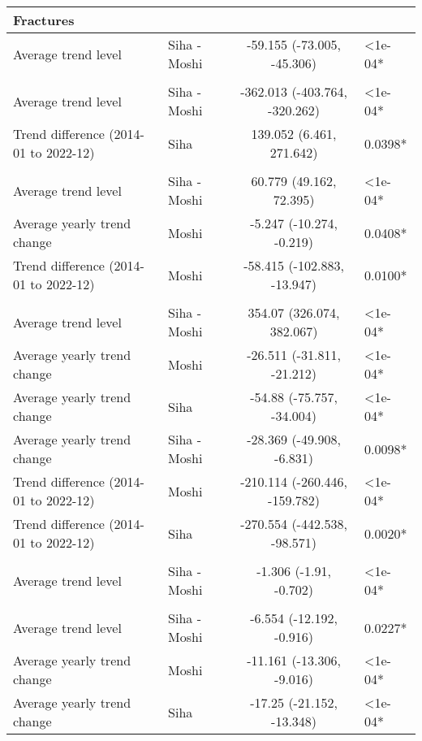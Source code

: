 \begin{longtable}{l|lcl}
\multicolumn{4}{l}{Fractures} \\ 
\midrule\addlinespace[2.5pt]
Average trend level & Siha - Moshi & -59.155 (-73.005, -45.306) & <1e-04* \\ 
\midrule\addlinespace[2.5pt]
\multicolumn{4}{l}{Hypertension} \\ 
\midrule\addlinespace[2.5pt]
Average trend level & Siha - Moshi & -362.013 (-403.764, -320.262) & <1e-04* \\ 
Trend difference (2014-01 to 2022-12) & Siha & 139.052 (6.461, 271.642) & 0.0398* \\ 
\midrule\addlinespace[2.5pt]
\multicolumn{4}{l}{Infectious Eye Disease} \\ 
\midrule\addlinespace[2.5pt]
Average trend level & Siha - Moshi & 60.779 (49.162, 72.395) & <1e-04* \\ 
Average yearly trend change & Moshi & -5.247 (-10.274, -0.219) & 0.0408* \\ 
Trend difference (2014-01 to 2022-12) & Moshi & -58.415 (-102.883, -13.947) & 0.0100* \\ 
\midrule\addlinespace[2.5pt]
\multicolumn{4}{l}{Intestinal Worms} \\ 
\midrule\addlinespace[2.5pt]
Average trend level & Siha - Moshi & 354.07 (326.074, 382.067) & <1e-04* \\ 
Average yearly trend change & Moshi & -26.511 (-31.811, -21.212) & <1e-04* \\ 
Average yearly trend change & Siha & -54.88 (-75.757, -34.004) & <1e-04* \\ 
Average yearly trend change & Siha - Moshi & -28.369 (-49.908, -6.831) & 0.0098* \\ 
Trend difference (2014-01 to 2022-12) & Moshi & -210.114 (-260.446, -159.782) & <1e-04* \\ 
Trend difference (2014-01 to 2022-12) & Siha & -270.554 (-442.538, -98.571) & 0.0020* \\ 
\midrule\addlinespace[2.5pt]
\multicolumn{4}{l}{Leprosy} \\ 
\midrule\addlinespace[2.5pt]
Average trend level & Siha - Moshi & -1.306 (-1.91, -0.702) & <1e-04* \\ 
\midrule\addlinespace[2.5pt]
\multicolumn{4}{l}{Malaria} \\ 
\midrule\addlinespace[2.5pt]
Average trend level & Siha - Moshi & -6.554 (-12.192, -0.916) & 0.0227* \\ 
Average yearly trend change & Moshi & -11.161 (-13.306, -9.016) & <1e-04* \\ 
Average yearly trend change & Siha & -17.25 (-21.152, -13.348) & <1e-04* \\ 

\end{longtable}
